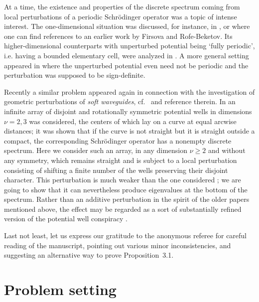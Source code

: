 \documentclass{article}
\numberwithin{equation}{section}
\theoremstyle{definition}
\begin{document}
At a time, the existence and properties of the discrete spectrum coming from local perturbations of a periodic Schr\"odinger operator was a topic of intense interest. The one-dimensional situation was discussed, for instance, in \cite{Zh71, Fa89}, or \cite{GS93} where one can find references to an earlier work by Firsova and Rofe-Beketov. Its higher-dimensional counterparts with unperturbed potential being `fully periodic', i.e. having a bounded elementary cell, were analyzed in \cite{DH86, FK98}. A more general setting appeared in \cite{ADH89} where the unperturbed potential even need not be periodic and the perturbation was supposed to be sign-definite.

Recently a similar problem appeared again in connection with the investigation of geometric perturbations of \emph{soft waveguides}, cf.~\cite{EV24} and reference therein. In \cite{Ex24} an infinite array of disjoint and rotationally symmetric potential wells in dimensions $\nu=2,3$ was considered, the centers of which lay on a curve at equal arcwise distances; it was shown that if the curve is not straight but it is straight outside a compact, the corresponding Schr\"odinger operator has a nonempty discrete spectrum. Here we consider such an array, in any dimension $\nu\ge 2$ and without any symmetry, which remains straight and is subject to a local perturbation consisting of shifting a finite number of the wells preserving their disjoint character. This perturbation is much weaker than the one considered \cite{Ex24}; we are going to show that it can nevertheless produce eigenvalues at the bottom of the spectrum. Rather than an additive perturbation in the spirit of the older papers mentioned above, the effect may be regarded as a sort of substantially refined version of the potential well conspiracy \cite{KS79}.

Last not least, let us express our gratitude to the anonymous referee for careful reading of the manuscript, pointing out various minor inconsistencies, and suggesting an alternative way to prove Proposition~3.1.

\section{Problem setting}
\label{s:setting}
\end{document}
